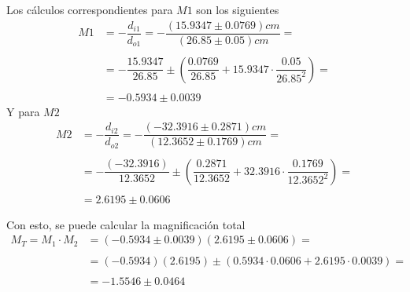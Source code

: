 \documentclass[a4paper, 10pt]{article}
\begin{document}
	Los cálculos correspondientes para $M1$ son los siguientes
	\begin{align*}
		M1&=-\dfrac{d_{i1}}{d_{o1}}=-\dfrac{(15.9347\pm0.0769)cm}{(26.85\pm 0.05) cm}=\\\\
		&=-\dfrac{15.9347}{26.85}\pm\left(\dfrac{0.0769}{26.85}+15.9347\cdot\dfrac{0.05}{26.85^2}\right)=\\\\
		&=-0.5934\pm0.0039 
	\end{align*}
	Y para $M2$
	\begin{align*}
		M2&=-\dfrac{d_{i2}}{d_{o2}}=-\dfrac{(-32.3916\pm 0.2871) cm}{(12.3652\pm0.1769)cm}=\\\\
		&=-\dfrac{(-32.3916)}{12.3652}\pm\left(\dfrac{0.2871}{12.3652}+32.3916\cdot\dfrac{0.1769}{12.3652^2}\right)=\\\\
		&=2.6195\pm0.0606
	\end{align*}
	
	Con esto, se puede calcular la magnificación total
	\begin{align*}
		M_T=M_1\cdot M_2&=(-0.5934\pm0.0039)(2.6195\pm0.0606)=\\\\
		&=(-0.5934)(2.6195)\pm\left(0.5934\cdot0.0606+2.6195\cdot0.0039\right)=\\\\
		&=-1.5546\pm0.0464 
	\end{align*}
	
\end{document}
